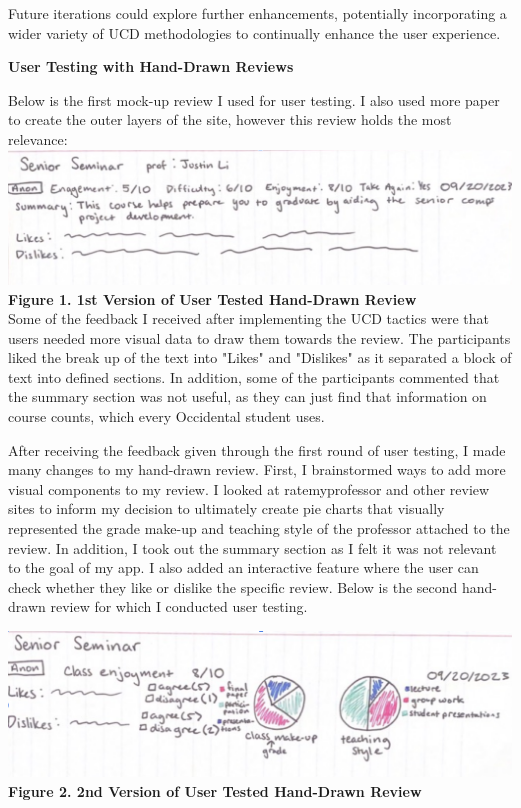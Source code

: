 \documentclass[10pt,twocolumn]{article}
\begin{document}
Future iterations could explore further enhancements, potentially incorporating a wider variety of UCD methodologies to continually enhance the user experience.


\begin{center} \textbf{User Testing with Hand-Drawn Reviews}\\ \end{center}


Below is the first mock-up review I used for user testing. I also used more paper to create the outer layers of the site, however this review holds the most relevance:\\


\includegraphics[scale=.25]{UT1}\\ \textbf{\footnotesize{Figure 1. 1st Version of User Tested Hand-Drawn Review}}\\

Some of the feedback I received after implementing the UCD tactics were that users needed more visual data to draw them towards the review. The participants liked the break up of the text into "Likes" and "Dislikes" as it separated a block of text into defined sections. In addition, some of the participants commented that the summary section was not useful, as they can just find that information on course counts, which every Occidental student uses. 

After receiving the feedback given through the first round of user testing, I made many changes to my hand-drawn review. First, I brainstormed ways to add more visual components to my review. I looked at ratemyprofessor and other review sites to inform my decision to ultimately create pie charts that visually represented the grade make-up and teaching style of the professor attached to the review. In addition, I took out the summary section as I felt it was not relevant to the goal of my app. I also added an interactive feature where the user can check whether they like or dislike the specific review. Below is the second hand-drawn review for which I conducted user testing.

\includegraphics[scale=.25]{UT2}\\ \textbf{\footnotesize{Figure 2. 2nd Version of User Tested Hand-Drawn Review}}
\end{document}
